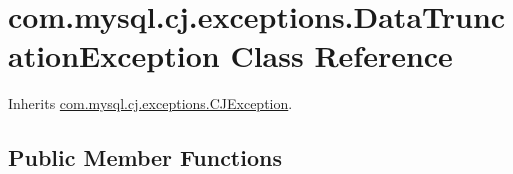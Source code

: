 \hypertarget{classcom_1_1mysql_1_1cj_1_1exceptions_1_1_data_truncation_exception}{}\section{com.\+mysql.\+cj.\+exceptions.\+Data\+Truncation\+Exception Class Reference}
\label{classcom_1_1mysql_1_1cj_1_1exceptions_1_1_data_truncation_exception}


Inherits \mbox{\hyperlink{classcom_1_1mysql_1_1cj_1_1exceptions_1_1_c_j_exception}{com.\+mysql.\+cj.\+exceptions.\+C\+J\+Exception}}.

\subsection*{Public Member Functions}
